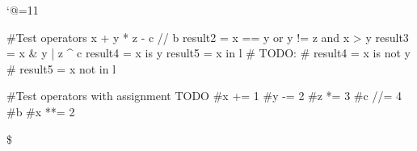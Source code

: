 \let\e\expandafter
\catcode`@=11








\def\@pytexChar@Backslash{\loggingall\@pytexParser@parse}
\let\@pytexChar@Dollar\bye



\@pytexCatcodes@setallactive

#Test operators
x + y * z - c // b %
result2 = x == y or y != z and x > y
result3 = x & y | z ^ c
result4 = x is y
result5 = x in l
# TODO:
# result4 = x is not y
# result5 = x not in l

#Test operators with assignment TODO
#x += 1
#y -= 2
#z *= 3
#c //= 4
#b %
#x **= 2

\$
\bye
